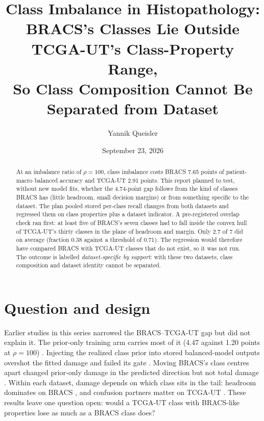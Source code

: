 \documentclass[11pt]{article}
\title{Class Imbalance in Histopathology:\\{BRACS}'s Classes Lie Outside {TCGA-UT}'s Class-Property Range,\\So Class Composition Cannot Be Separated from Dataset}
\author{Yannik Queisler}
\date{September 23, 2026}
\begin{document}
\raggedbottom
{}
\setlength{\emergencystretch}{2em}
\maketitle
\begin{abstract}
\noindent At an imbalance ratio of $\rho=100$, class imbalance costs BRACS 7.65 points of patient-macro balanced accuracy and TCGA-UT 2.91 points. This report planned to test, without new model fits, whether the 4.74-point gap follows from the kind of classes BRACS has (little headroom, small decision margins) or from something specific to the dataset. The plan pooled stored per-class recall changes from both datasets and regressed them on class properties plus a dataset indicator. A pre-registered overlap check ran first: at least five of BRACS's seven classes had to fall inside the convex hull of TCGA-UT's thirty classes in the plane of headroom and margin. Only 2.7 of 7 did on average (fraction 0.38 against a threshold of 0.71). The regression would therefore have compared BRACS with TCGA-UT classes that do not exist, so it was not run. The outcome is labelled \emph{dataset-specific by support}: with these two datasets, class composition and dataset identity cannot be separated.
\end{abstract}

\section{Question and design}
\label{sec:design}
Earlier studies in this series narrowed the BRACS--TCGA-UT gap but did not explain it. The prior-only training arm carries most of it (4.47 against 1.20 points at $\rho=100$) \citep{queisler2026causeTcga, queisler2026causeBracs}. Injecting the realized class prior into stored balanced-model outputs overshot the fitted damage and failed its gate \citep{queisler2026marginTcgaBracs}. Moving BRACS's class centres apart changed prior-only damage in the predicted direction but not total damage \citep{queisler2026separationTcgaBracs}. Within each dataset, damage depends on which class sits in the tail: headroom dominates on BRACS \citep{queisler2026tailBracs}, and confusion partners matter on TCGA-UT \citep{queisler2026tailTcga, queisler2026worstRateTcga}. These results leave one question open: would a TCGA-UT class with BRACS-like properties lose as much as a BRACS class does?
\end{document}
